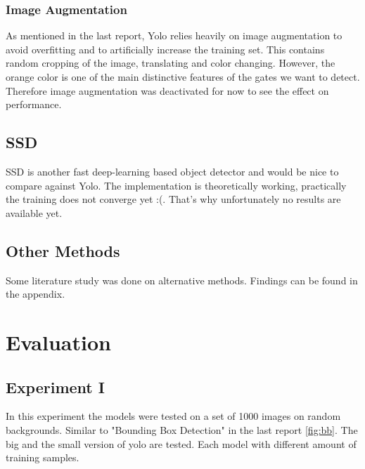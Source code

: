 \documentclass{article}
\begin{document}
\subsubsection{Image Augmentation}

As mentioned in the last report, Yolo relies heavily on image augmentation to avoid overfitting and to artificially increase the training set. This contains random cropping of the image, translating and color changing. However, the orange color is one of the main distinctive features of the gates we want to detect. Therefore image augmentation was deactivated for now to see the effect on performance.

\subsection{SSD}

SSD is another fast deep-learning based object detector and would be nice to compare against Yolo. The implementation is theoretically working, practically the training does not converge yet :(. That's why unfortunately no results are available yet.

\subsection{Other Methods}

Some literature study was done on alternative methods. Findings can be found in the appendix.

\section{Evaluation}

\subsection{Experiment I}

In this experiment the models were tested on a set of 1000 images on random backgrounds. Similar to "Bounding Box Detection" in the last report \autoref{fig:bb}. The big and the small version of yolo are tested. Each model with different amount of training samples.
\end{document}
